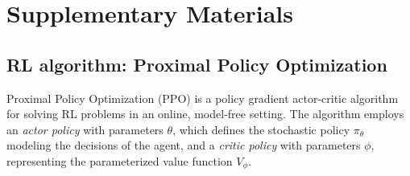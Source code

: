 \newpage
\clearpage

\fancyhf{} %

\setcounter{page}{1}       
\setcounter{section}{0}    
\setcounter{figure}{0}     
\setcounter{table}{0}      
\setcounter{equation}{0}   

\section{Supplementary Materials}
\subsection{RL algorithm: Proximal Policy Optimization}
\label{sec:ppo}
Proximal Policy Optimization (PPO) \cite{ppo} is a policy gradient actor-critic algorithm for solving RL problems in an online, model-free setting. The algorithm employs an \textit{actor policy} with parameters $\theta$, which defines the stochastic policy $\pi_{\theta}$ modeling the decisions of the agent, and a \textit{critic policy} with parameters $\phi$, representing the parameterized value function $V_{\phi}$. 

